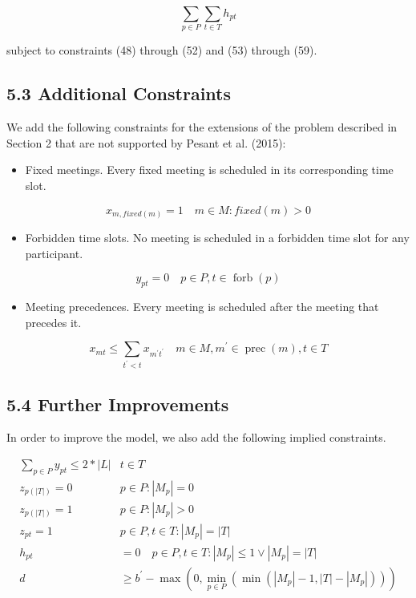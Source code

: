\documentclass[10pt]{article}
\begin{document}
\begin{equation*}
\sum_{p \in P} \sum_{t \in T} h_{p t} \tag{60}
\end{equation*}


subject to constraints (48) through (52) and (53) through (59).

\subsection*{5.3 Additional Constraints}
We add the following constraints for the extensions of the problem described in Section 2 that are not supported by Pesant et al. (2015):

\begin{itemize}
  \item Fixed meetings. Every fixed meeting is scheduled in its corresponding time slot.
\end{itemize}


\begin{equation*}
x_{m, f i x e d(m)}=1 \quad m \in M: f i x e d(m)>0 \tag{61}
\end{equation*}


\begin{itemize}
  \item Forbidden time slots. No meeting is scheduled in a forbidden time slot for any participant.
\end{itemize}


\begin{equation*}
y_{p t}=0 \quad p \in P, t \in \operatorname{forb}(p) \tag{62}
\end{equation*}


\begin{itemize}
  \item Meeting precedences. Every meeting is scheduled after the meeting that precedes it.
\end{itemize}


\begin{equation*}
x_{m t} \leq \sum_{t^{\prime}<t} x_{m^{\prime} t^{\prime}} \quad m \in M, m^{\prime} \in \operatorname{prec}(m), t \in T \tag{63}
\end{equation*}


\subsection*{5.4 Further Improvements}
In order to improve the model, we also add the following implied constraints.

\[
\begin{array}{rl}
\sum_{p \in P} y_{p t} \leq 2 *|L| & t \in T \\
z_{p(|T|)}=0 & p \in P:\left|M_{p}\right|=0 \\
z_{p(|T|)}=1 & p \in P:\left|M_{p}\right|>0 \\
z_{p t}=1 & p \in P, t \in T:\left|M_{p}\right|=|T| \\
h_{p t} & =0 \quad p \in P, t \in T:\left|M_{p}\right| \leq 1 \vee\left|M_{p}\right|=|T| \\
d & \geq b^{\prime}-\max \left(0, \min _{p \in P}\left(\min \left(\left|M_{p}\right|-1,|T|-\left|M_{p}\right|\right)\right)\right) \tag{69}
\end{array}
\]
\end{document}
